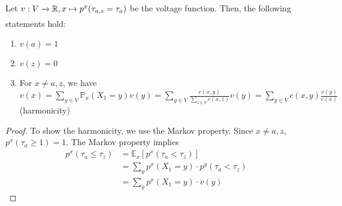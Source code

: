 \begin{lem}
  Let $v: V \myxrightarrow[]{} \mathbb{R}, x \mapsto p^x(\tau_{a,z}=\tau_a)$ be the voltage function. Then, the following statements hold:
  \begin{enumerate}
      \item \(v(a)=1\)
      \item \(v(z)=0\)
      \item For $x\neq a,z$, we have \(v(x) = \sum_{y\in V}^{} \mathbb{P}_x(X_1=y) v(y) = \sum_{y\in V}^{} \frac{c(x,y)}{\sum_{z\in V} c(x,z) }v(y) = \sum_{y\in V}^{} c(x,y) \frac{v(y)}{c(x)}\) (harmonicity)
  \end{enumerate}
\end{lem}
\begin{proof}
    To show the harmonicity, we use the Markov property. Since \(x \neq a,z\), \(p^x(\tau_a\geq 1)=1\). The Markov property implies 
    \begin{align*}
      p^x(\tau_a \leq \tau_z) &= \mathbb{E}_x \left[ p^x(\tau_a < \tau_z)\right] \\
                              &= \sum_y p^x(X_1=y)\cdot p^y(\tau_a < \tau_z) \\
                              &= \sum_y p^x(X_1=y) \cdot v(y)
    \end{align*}    
\end{proof}

